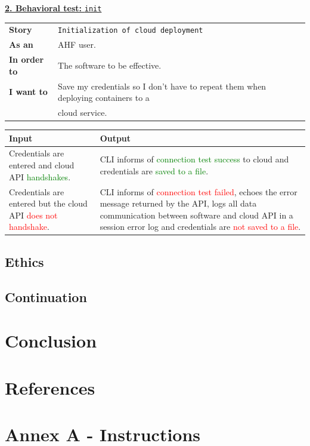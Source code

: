 \documentclass[a4paper,15pt,twoside]{article}
\begin{document}
\begin{center}
\large{\underline{\textbf{2. Behavioral test:} \texttt{init}}}
\vspace{-10px}
\end{center}
\begin{table}[H]
\centering
\begin{tabular}{ll}
\textbf{Story}   & \texttt{Initialization of cloud deployment} \\
\textbf{As an} & AHF user. \\
\textbf{In order to} & The software to be effective. \\
\textbf{I want to} & Save my credentials so I don't have to repeat them when deploying containers to a \\& cloud service.
\end{tabular}
\end{table}
\vspace{-12px}
\begin{table}[H]
\centering
\begin{tabular}{|p{8cm}|p{8cm}|}
\hline
\textbf{Input} & \textbf{Output} \\ \hline
Credentials are entered and cloud API \textcolor{green}{handshakes}. & CLI informs of \textcolor{green}{connection test success} to cloud and credentials are \textcolor{green}{saved to a file}. \\ \hline
Credentials are entered but the cloud API \textcolor{red}{does not handshake}. & CLI informs of \textcolor{red}{connection test failed}, echoes the error message returned by the API, 
logs all data communication between software and cloud API in a session error log and credentials are \textcolor{red}{not saved to a file}. \\ \hline
\end{tabular}
\end{table}

\subsection{Ethics}

\subsection{Continuation}

\newpage
\section{Conclusion}

\newpage
\section{References}

\newpage
\section{Annex A - Instructions}
\end{document}
